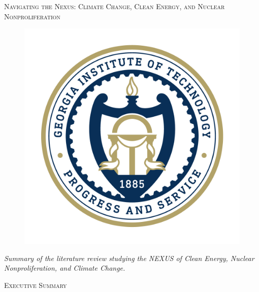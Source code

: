 \documentclass[11,5 pt]{article}
\begin{document}
\begin{titlepage}

\centering

{\scshape\LARGE Navigating the Nexus: Climate Change, Clean Energy, and Nuclear Nonproliferation \par}
\begin{figure}[ht!]
\centering
\vspace{0.5 cm}
\includegraphics[scale=0.25]{images/gt-seal_0.png}
\end{figure}
\vspace{0.39 cm}

\centering

{\itshape\LARGE Summary of the literature review studying the NEXUS of Clean Energy, Nuclear Nonproliferation, and Climate Change.
 \par}
\vspace{1.3cm}
{\scshape\LARGE  Executive Summary \par}
\vspace{0.2 cm}


\end{titlepage}
\end{document}
